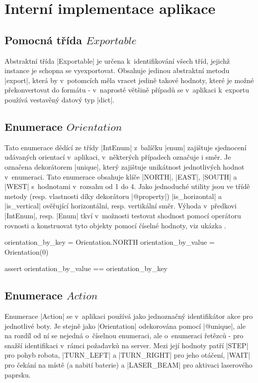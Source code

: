 \section{Interní implementace aplikace}
\label{sec:implementation}

\subsection{Pomocná třída $Exportable$}

Abstraktní třída \ic|Exportable| je určena k~identifikování všech tříd, jejichž instance je schopna se vyexportovat. Obsahuje jedinou abstraktní metodu \ic|export|, která by v~potomcích měla vracet jedině takové hodnoty, které je možné překonvertovat do formátu  - v~naprosté většině případů se v~aplikaci k~exportu používá vestavěný datový typ \ic|dict|.

\subsection{Enumerace $Orientation$}

Tato enumerace dědící ze třídy \ic|IntEnum| z~balíčku \ic|enum| zajištuje sjednocení udávaných orientací v~aplikaci, v~některých případech označuje i směr. Je označena dekorátorem \ic|unique|, který zajištuje unikátnost jednotlivých hodnot v~enumeraci. Tato enumerace obsahuje klíče \ic|NORTH|, \ic|EAST|, \ic|SOUTH| a \ic|WEST| s~hodnotami v~rozsahu od 1 do 4. Jako jednoduché utility jsou ve třídě metody (resp. vlastnosti díky dekorátoru \ic|@property|) \ic|is_horizontal| a \ic|is_vertical| ověřující horizontální, resp. vertikální směr. Výhoda v~předkovi \ic|IntEnum|, resp. \ic|Enum| tkví v~možnosti testovat shodnost pomocí operátoru rovnosti a konstruovat tyto objekty pomocí číselné hodnoty, viz ukázka .

\begin{code}[caption={Výhody třídy $Enum$},label={lst:enum-pros}]
orientation_by_key = Orientation.NORTH
orientation_by_value = Orientation(0)

assert orientation_by_value == orientation_by_key
\end{code}

\subsection{Enumerace $Action$}
\label{subsec:action-enum}
Enumerace \ic|Action| se v~aplikaci používá jako jednoznačný identifikátor akce pro jednotlivé boty. Je stejně jako \ic|Orientation| odekorována pomocí \ic|@unique|, ale na rozdíl od ní se nejedná o~číselnou enumeraci, ale o~enumeraci řetězců - pro snažší identifikaci v~rámci požadavků na server.
Mezi její hodnoty patří \ic|STEP| pro pohyb robota, \ic|TURN_LEFT| a \ic|TURN_RIGHT| pro jeho otáčení, \ic|WAIT| pro čekání na místě (a nabití baterie) a \ic|LASER_BEAM| pro aktivaci laserového paprsku.

